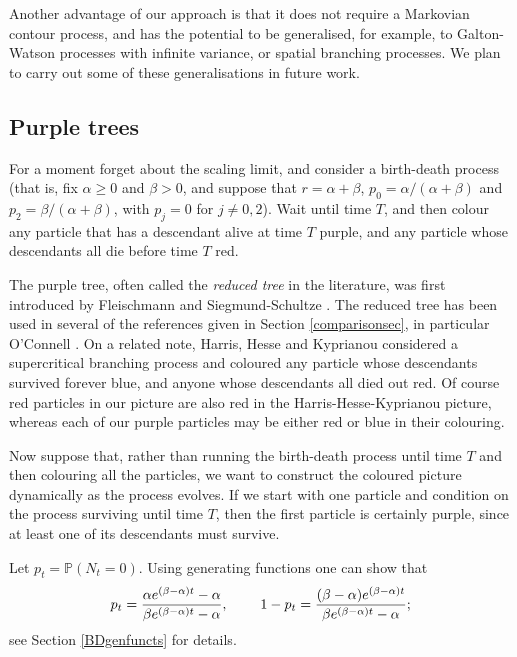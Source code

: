 \documentclass{article}
\theoremstyle{plain}
\theoremstyle{definition}
\renewcommand{\P}{\mathbb{P}}
\begin{document}
Another advantage of our approach is that it does not require a Markovian contour process, and has the potential to be generalised, for example, to Galton-Watson processes with infinite variance, or spatial branching processes. We plan to carry out some of these generalisations in future work.



\subsection{Purple trees}

For a moment forget about the scaling limit, and consider a birth-death process (that is, fix $\alpha\ge 0$ and $\beta>0$, and suppose that $r = \alpha+\beta$, $p_0 = \alpha/(\alpha+\beta)$ and $p_2 = \beta/(\alpha+\beta)$, with $p_j=0$ for $j\neq 0,2$). Wait until time $T$, and then colour any particle that has a descendant alive at time $T$ purple, and any particle whose descendants all die before time $T$ red.

The purple tree, often called the \emph{reduced tree} in the literature, was first introduced by Fleischmann and Siegmund-Schultze \cite{fleischmann_ss:reduced_GW}. The reduced tree has been used in several of the references given in Section \ref{comparisonsec}, in particular O'Connell \cite{oconnell:genealogy_mrca}. On a related note, Harris, Hesse and Kyprianou \cite{harris_hesse_kyprianou:bbm_strip} considered a supercritical branching process and coloured any particle whose descendants survived forever blue, and anyone whose descendants all died out red. Of course red particles in our picture are also red in the Harris-Hesse-Kyprianou picture, whereas each of our purple particles may be either red or blue in their colouring.

Now suppose that, rather than running the birth-death process until time $T$ and then colouring all the particles, we want to construct the coloured picture dynamically as the process evolves. If we start with one particle and condition on the process surviving until time $T$, then the first particle is certainly purple, since at least one of its descendants must survive.

Let $p_t = \P(N_t=0)$. Using generating functions one can show that
\[p_t = \frac{\alpha e^{(\beta-\alpha)t}-\alpha}{\beta e^{(\beta-\alpha)t}-\alpha}, \hspace{8mm} 1-p_t = \frac{(\beta-\alpha)e^{(\beta-\alpha)t}}{\beta e^{(\beta-\alpha)t}-\alpha};\]
see Section \ref{BDgenfuncts} for details.
\end{document}
